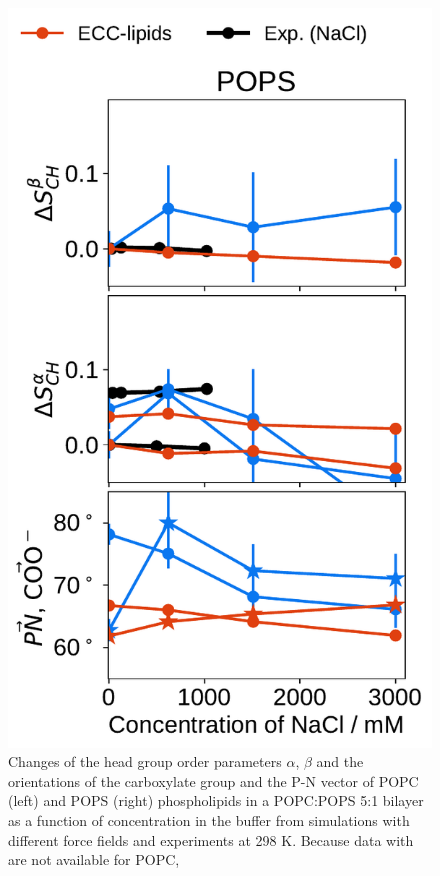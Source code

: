 \documentclass[journal=jpcbfk,manuscript=article]{achemso}
\newlength{\figheight}
\begin{document}
\begin{figure}[tbp!]
  \includegraphics[height=\figheight]{../img/ecc_pops/order_parameters_changes_ecc-lip_L14_A-B-PN-COO_POPS_nacl.pdf} 
  \caption{\label{fig:delta_ordPar_NaCl_PCPS} 
    Changes of the head group order parameters $\alpha$, $\beta$ and the orientations of the carboxylate group and the P-N vector  
    of POPC (left) and POPS (right) phospholipids in a POPC:POPS 5:1 bilayer 
    as a function of  concentration in the buffer 
    from simulations with different force fields and experiments at 298 K. \citep{roux90}
    Because data with  are not available for POPC, 
}
\end{figure}
\end{document}
